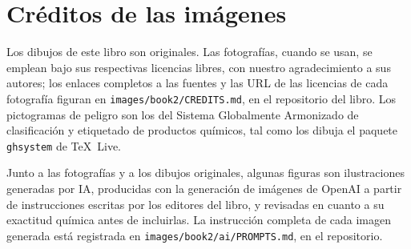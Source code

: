 \chapter*{Créditos de las imágenes}

Los dibujos de este libro son originales. Las fotografías, cuando se
usan, se emplean bajo sus respectivas licencias libres, con nuestro
agradecimiento a sus autores; los enlaces completos a las fuentes y las
URL de las licencias de cada fotografía figuran en
\texttt{images/book2/CREDITS.md}, en el repositorio del libro.
Los pictogramas de peligro son los del Sistema Globalmente Armonizado de
clasificación y etiquetado de productos químicos, tal como los dibuja el
paquete \texttt{ghsystem} de \TeX\ Live.

\bigskip
Junto a las fotografías y a los dibujos originales, algunas figuras son
ilustraciones generadas por IA, producidas con la generación de imágenes
de OpenAI a partir de instrucciones escritas por los editores del libro,
y revisadas en cuanto a su exactitud química antes de incluirlas. La
instrucción completa de cada imagen generada está registrada en
\texttt{images/book2/ai/PROMPTS.md}, en el repositorio.

